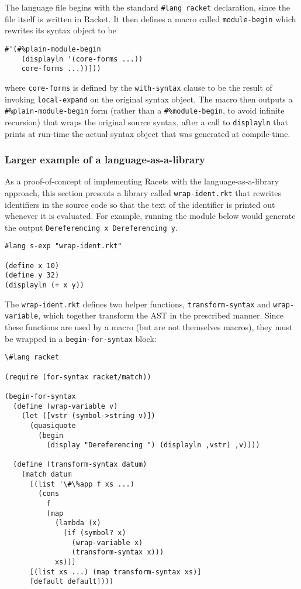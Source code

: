 \documentclass{article}
\begin{document}
The language file begins with the standard \texttt{\#lang racket} declaration, since the file itself is written in Racket. It then defines a macro called \texttt{module-begin} which rewrites its syntax object to be

\begin{lstlisting}
#'(#%plain-module-begin
    (displayln '(core-forms ...))
    core-forms ...))]))
\end{lstlisting}

where \texttt{core-forms} is defined by the \texttt{with-syntax} clause to be the result of invoking \texttt{local-expand} on the original syntax object. The macro then outputs a \texttt{\#\%plain-module-begin} form (rather than a \texttt{\#\%module-begin}, to avoid infinite recursion) that wraps the original source syntax, after a call to \texttt{displayln} that prints at run-time the actual syntax object that was generated at compile-time.

\subsubsection{Larger example of a language-as-a-library}
As a proof-of-concept of implementing Racets with the language-as-a-library approach, this section presents a library called \texttt{wrap-ident.rkt} that rewrites identifiers in the source code so that the text of the identifier is printed out whenever it is evaluated. For example, running the module below would generate the output \texttt{Dereferencing x  Dereferencing y}.

\begin{lstlisting}
#lang s-exp "wrap-ident.rkt"

(define x 10)
(define y 32)
(displayln (+ x y))
\end{lstlisting}

The \texttt{wrap-ident.rkt} defines two helper functions, \texttt{transform-syntax} and \texttt{wrap-variable}, which together transform the AST in the prescribed manner. Since these functions are used by a macro (but are not themselves macros), they must be wrapped in a \texttt{begin-for-syntax} block:

\begin{lstlisting}
\#lang racket

(require (for-syntax racket/match))

(begin-for-syntax
  (define (wrap-variable v)
    (let ([vstr (symbol->string v)])
      (quasiquote
        (begin
          (display "Dereferencing ") (displayln ,vstr) ,v))))

  (define (transform-syntax datum)
    (match datum
      [(list '\#\%app f xs ...)
        (cons
          f
          (map
            (lambda (x)
              (if (symbol? x)
                (wrap-variable x)
                (transform-syntax x)))
            xs))]
      [(list xs ...) (map transform-syntax xs)]
      [default default])))
\end{lstlisting}
\end{document}
